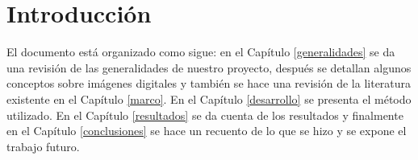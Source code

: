 \newpage
{}
\chapter*{Introducción}

El documento está organizado como sigue: en el Capítulo \ref{generalidades} se
da una revisión de las generalidades de nuestro proyecto, después se detallan
algunos conceptos sobre imágenes digitales y también se hace una revisión de la
literatura existente en el Capítulo \ref{marco}. En el Capítulo
\ref{desarrollo} se presenta el método utilizado. En el Capítulo
\ref{resultados} se da cuenta de los resultados y finalmente en el Capítulo
\ref{conclusiones} se hace un recuento de lo que se hizo y se expone el trabajo
futuro.

